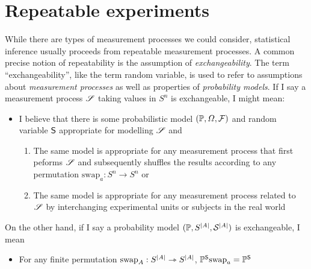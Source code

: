 
\section{Repeatable experiments}

While there are types of measurement processes we could consider, statistical inference usually proceeds from repeatable measurement processes. A common precise notion of repeatability is the assumption of \emph{exchangeability}. The term ``exchangeability'', like the term random variable, is used to refer to assumptions about \emph{measurement processes} as well as properties of \emph{probability models}. If I say a measurement process $\mathscr{S}$ taking values in $S^n$ is exchangeable, I might mean:
\begin{itemize}
    \item I believe that there is some probabilistic model $(\mathbb{P},\Omega,\mathcal{F})$ and random variable $\mathsf{S}$ appropriate for modelling $\mathscr{S}$ and
    \begin{enumerate}
        \item The same model is appropriate for any measurement process that first peforms $\mathscr{S}$ and subsequently shuffles the results according to any permutation $\text{swap}_a:S^n\to S^n$ or
        \item The same model is appropriate for any measurement process related to $\mathscr{S}$ by interchanging experimental units or subjects in the real world
    \end{enumerate} 
\end{itemize}

On the other hand, if I say a probability model $(\mathbb{P},S^{|A|},\mathcal{S}^{|A|})$ is exchangeable, I mean

\begin{itemize}
    \item For any finite permutation $\text{swap}_A:S^{|A|}\rightarrowtriangle S^{|A|}$, $\mathbb{P}^{\mathsf{S}}\text{swap}_{a} = \mathbb{P}^{\mathsf{S}}$
\end{itemize}

